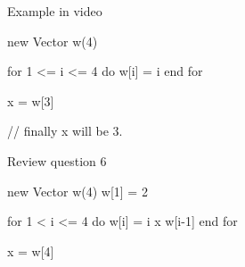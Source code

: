 Example in video

new Vector w(4)

for 1 <= i <= 4 do
  w[i] = i
end for

x = w[3]

// finally x will be 3.

Review question 6

new Vector w(4)
w[1] = 2

for 1 < i <= 4 do
  w[i] = i x w[i-1]
end for

x = w[4]
